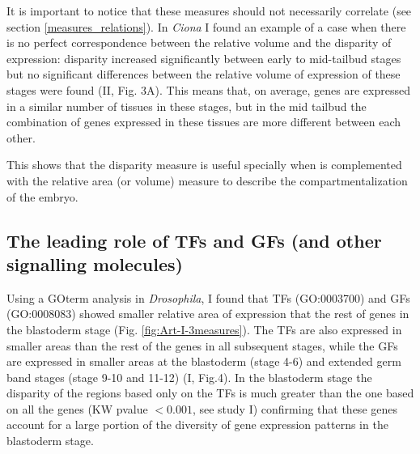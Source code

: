 It is important to notice that these measures should not necessarily correlate (see section \ref{measures_relations}).
%
In \textit{Ciona} I found an example of a case when there is no perfect correspondence between the relative volume and the disparity of expression: disparity increased significantly between early to mid-tailbud stages but no significant differences between the relative volume of expression of these stages were found (II, Fig. 3A).
This means that, on average, genes are expressed in a similar number of tissues in these stages, but in the mid tailbud the combination of genes expressed in these tissues are more different between each other.

This shows that the disparity measure is useful specially when is complemented with the relative area (or volume) measure to describe the compartmentalization of the embryo.


\subsection{The leading role of TFs and GFs (and other signalling molecules)}


Using a GOterm analysis in \textit{Drosophila}, I found that TFs (GO:0003700) and GFs (GO:0008083) showed smaller relative area of expression that the rest of genes in the blastoderm stage (Fig. \ref{fig:Art-I-3measures}).
%
The TFs are also expressed in smaller areas than the rest of the genes in all subsequent stages, while the GFs are expressed in smaller areas at the blastoderm (stage 4-6) and extended germ band stages (stage 9-10 and 11-12) (I, Fig.4). In the blastoderm stage the disparity of the regions based only on the TFs is much greater than the one based on all the genes (KW pvalue $<0.001$, see study I) confirming that these genes account for a large portion of the diversity of gene expression patterns in the blastoderm stage.

